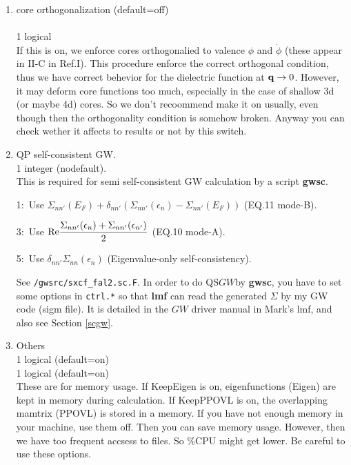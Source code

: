 \documentclass[a4paper,10pt,epsf,fleqn]{article}
\newcommand{\GW}{$GW$}
\newcommand{\keyw}[1]{\fbox{\tt #1}}
\newcommand{\ds}{\displaystyle}
\begin{document}
{\begin{enumerate}
Note:In addition, we found that it was necessary to use \verb#LMXA=6#
($l$ in the expantion of eigenfunction in MT) or so was necessary
to keep the normarization of eigenfunction rather accurately for Na.

\item core orthogonalization (default=off)\\\\
\keyw{CoreOrth} 1 logical\\
If this is on, we enforce cores orthogonalied to valence 
$\phi$ and $\dot{\phi}$ (these appear in II-C in Ref.I).
This procedure enforce the correct orthogonal condition, thus
we have correct behevior for the dielectric function at ${\bf q} \to 0$.
However, it may deform core functions too much, 
especially in the case of shallow 3d (or maybe 4d) cores.
So we don't recoommend make it on usually, even though then 
the orthogonality condition is somehow broken.
Anyway you can check wether it affects to results or not by this switch.


\item QP self-consistent GW.\\
\keyw{iSigMode} 1 integer (nodefault).\\
This is required for semi self-consistent GW calculation by a script {\bf gwsc}.

1:\ Use $\ds \Sigma_{nn'}(E_F) + \delta_{nn'}(\Sigma_{nn'}(\epsilon_n)-\Sigma_{nn'}(E_F))$
   (EQ.11 mode-B).

3:\ Use $\ds {\rm Re}\frac{\Sigma_{nn'}(\epsilon_n)+\Sigma_{nn'}(\epsilon_{n'})}{2}$
  (EQ.10 mode-A).

5:\ Use $\ds \delta_{nn'} \Sigma_{nn}(\epsilon_n)$ (Eigenvalue-only self-consistency).

See \verb#/gwsrc/sxcf_fal2.sc.F#.
In order to do QS\GW by {\bf gwsc}, you have to set some options
in {\tt ctrl.*} so that {\bf lmf} can read the generated $\Sigma$ by my GW code (sigm file).
It is detailed in the $GW$ driver manual in Mark's lmf, and also see Section \ref{scgw}.

\item Others\\
\keyw{KeepEigen} 1 logical (default=on)\\
\keyw{KeepPPOVL} 1 logical (default=on)\\
These are for memory usage.
If KeepEigen is on, eigenfunctions (Eigen) are kept in memory during calculation.
If KeepPPOVL is on, the overlapping mamtrix (PPOVL) is stored 
in a memory. If you have not enough memory in your machine,
use them off. Then you can save memory usage.
However, then we have too frequent accsess to files.
So \%CPU might get lower. Be careful to use these options.



\end{enumerate}}
\end{document}

